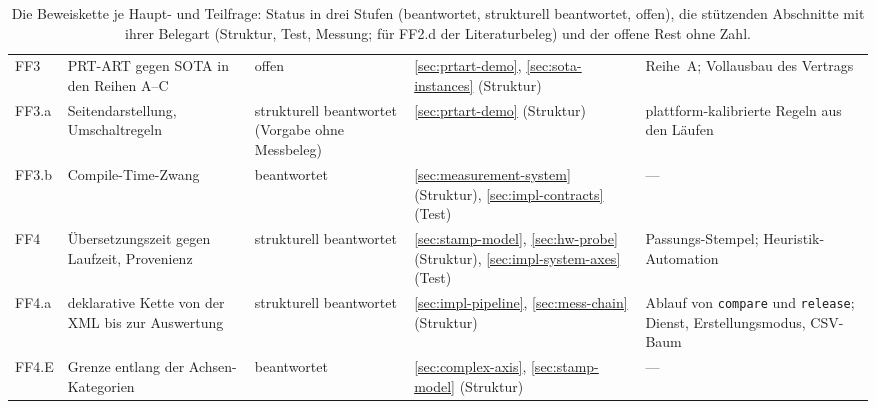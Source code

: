 \begin{table}[htbp]
\begin{tabular}{@{}>{\raggedright\arraybackslash}p{0.9cm}>{\raggedright\arraybackslash}p{3.0cm}>{\raggedright\arraybackslash}p{2.0cm}>{\raggedright\arraybackslash}p{4.8cm}>{\raggedright\arraybackslash}p{3.3cm}@{}}
FF3 & PRT-ART gegen SOTA in den Reihen A--C & offen & {\ref{sec:prtart-demo}}, {\ref{sec:sota-instances}} (Struktur) & Reihe~A\@; Vollausbau des Vertrags \\
FF3.a & Seitendarstellung, Umschaltregeln & strukturell beantwortet (Vorgabe ohne Messbeleg) & {\ref{sec:prtart-demo}} (Struktur) & plattform-kalibrierte Regeln aus den Läufen \\
FF3.b & Compile-Time-Zwang & beantwortet & {\ref{sec:measurement-system}} (Struktur), {\ref{sec:impl-contracts}} (Test) & --- \\
FF4 & Übersetzungszeit gegen Laufzeit, Provenienz & strukturell beantwortet & {\ref{sec:stamp-model}}, {\ref{sec:hw-probe}} (Struktur), {\ref{sec:impl-system-axes}} (Test) & Passungs-Stempel; Heuristik-Automation \\
FF4.a & deklarative Kette von der XML bis zur Auswertung & strukturell beantwortet & {\ref{sec:impl-pipeline}}, {\ref{sec:mess-chain}} (Struktur) & Ablauf von \texttt{compare} und \texttt{release}; Dienst, Erstellungsmodus, CSV-Baum \\
FF4.E & Grenze entlang der Achsen-Kategorien & beantwortet & {\ref{sec:complex-axis}}, {\ref{sec:stamp-model}} (Struktur) & --- \\
\bottomrule
\end{tabular}
\caption{Die Beweiskette je Haupt- und Teilfrage: Status in drei Stufen (beantwortet, strukturell
beantwortet, offen), die stützenden Abschnitte mit ihrer Belegart (Struktur, Test, Messung; für FF2.d der
Literaturbeleg) und der offene Rest ohne Zahl.}\label{tab:ff-beweiskette}
\end{table}

